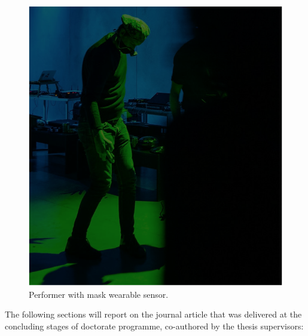 \label{case_studies:adse_ess}

\begin{figure}[!h]
\captionsetup{width=1.0\textwidth}
\centering
\includegraphics[width=0.6
\textwidth,keepaspectratio]{Chapters/Figures/adse_ess/CSL_MASK_MICK.png}
{\caption{Performer with mask wearable sensor.
}\label{fig:sensor_model}}
\end{figure}

The following sections will report on the journal article that was delivered at the concluding stages of doctorate programme, co-authored by the thesis supervisors:


